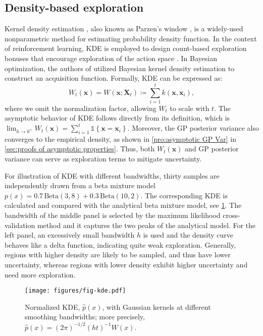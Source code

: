 \documentclass[11pt,en]{elegantpaper}
\newcommand{\X}{\bm{X}}
\newcommand{\x}{\bm{x}}
\newcommand{\1}{\mathds{1}}
\newcommand{\set}[1]{\left\{#1\right\}}
\begin{document}
\subsection{Density-based exploration}
\label{sec:density-based exploration}

Kernel density estimation \cite{rosenblat1956remarks}, also known as Parzen's window \cite{parzen1962estimation}, is a widely-used nonparametric method for estimating probability density function. In the context of reinforcement learning, KDE is employed to design count-based exploration bonuses that encourage exploration of the action space \cite{bellemare2016unifying}. In Bayesian optimization, the authors of \cite{hase2018phoenics} utilized Bayesian kernel density estimation to construct an acquisition function.
Formally, KDE can be expressed as:
\begin{equation}
    \label{eqn:KDE}
    W_t(\x) =W(\x; \X_t) \coloneqq \sum_{i=1}^{t} k(\x, \x_i),
\end{equation}
where we omit the normalization factor, allowing $W_t$ to scale with $t$.
The asymptotic behavior of KDE follows directly from its definition, which is $\lim_{h \to 0^+} W_t(\x) = \sum_{i=1}^{t} \1{\set{\x = \x_i}}$.
Moreover, the GP posterior variance also converges to the empirical density, as shown in \cref{pro:asymptotic GP Var} in \cref{sec:proofs of asymptotic properties}.
Thus, both $W_t(\x)$ and GP posterior variance can serve as exploration terms to mitigate uncertainty.


For illustration of KDE with different bandwidths, thirty samples are independently drawn from a beta mixture model $p(x) = 0.7 \, \mathrm{Beta}(3, 8) + 0.3 \, \mathrm{Beta}(10, 2)$. The corresponding KDE is calculated and compared with the analytical beta mixture model, see \cref{fig:kde}. The bandwidth of the middle panel is selected by the maximum likelihood cross-validation method and it captures the two peaks of the analytical model. For the left panel, an excessively small bandwidth $h$ is used and the density curve behaves like a delta function, indicating quite weak exploration. Generally, regions with higher density are likely to be sampled, and thus have lower uncertainty, whereas regions with lower density exhibit higher uncertainty and need more exploration.


\begin{figure}[H]
    \centering
    \texttt{[image: figures/fig-kde.pdf]}
    \caption{
        Normalized KDE, $\widehat{p}(x)$, with Gaussian kernels at different smoothing bandwidths; more precisely, $\widehat{p}(x) = (2 \pi)^{-1/2} (ht)^{-1} W(x)$.
    }
    \label{fig:kde}
\end{figure}
\end{document}
